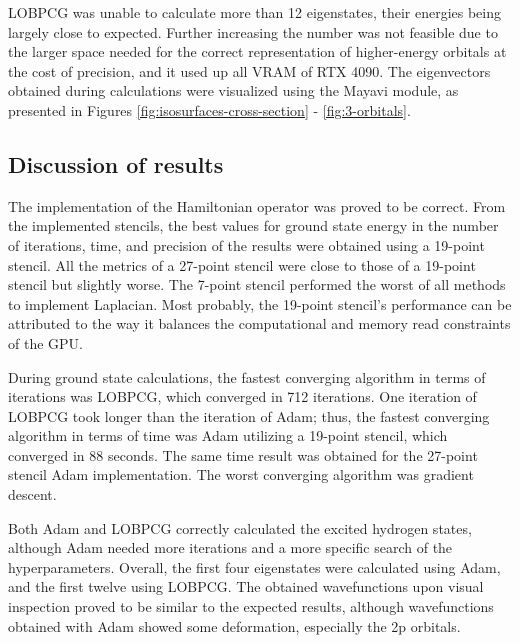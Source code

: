 LOBPCG was unable to calculate more than 12 eigenstates, their energies being largely close to expected. Further increasing the number was not feasible due to the larger space needed for the correct representation of higher-energy orbitals at the cost of precision, and it used up all VRAM of RTX 4090. The eigenvectors obtained during calculations were visualized using the Mayavi module, as presented in Figures \ref{fig:isosurfaces-cross-section} - \ref{fig:3-orbitals}.

\subsection{Discussion of results}

The implementation of the Hamiltonian operator was proved to be correct. From the implemented stencils, the best values for ground state energy in the number of iterations, time, and precision of the results were obtained using a 19-point stencil. All the metrics of a 27-point stencil were close to those of a 19-point stencil but slightly worse. The 7-point stencil performed the worst of all methods to implement Laplacian. Most probably, the 19-point stencil's performance can be attributed to the way it balances the computational and memory read constraints of the GPU.

During ground state calculations, the fastest converging algorithm in terms of iterations was LOBPCG, which converged in 712 iterations. One iteration of LOBPCG took longer than the iteration of Adam; thus, the fastest converging algorithm in terms of time was Adam utilizing a 19-point stencil, which converged in 88 seconds. The same time result was obtained for the 27-point stencil Adam implementation. The worst converging algorithm was gradient descent.

Both Adam and LOBPCG correctly calculated the excited hydrogen states, although Adam needed more iterations and a more specific search of the hyperparameters. Overall, the first four eigenstates were calculated using Adam, and the first twelve using LOBPCG. The obtained wavefunctions upon visual inspection proved to be similar to the expected results, although wavefunctions obtained with Adam showed some deformation, especially the 2p orbitals.

